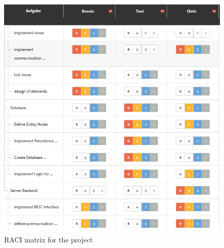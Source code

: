 \begin{figure}[H]
	\centering
	\includegraphics[width =1.0\textwidth]{images/raci.PNG}
	\caption{RACI matrix for the project}
	\label{raci}
\end{figure}